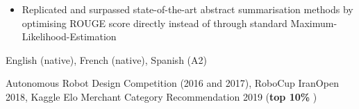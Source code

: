 \begin{itemize}
    \item Replicated and surpassed state-of-the-art abstract summarisation methods by optimising ROUGE score directly instead of through standard Maximum-Likelihood-Estimation
\end{itemize}{}






English (native), French (native), Spanish (A2)


Autonomous Robot Design Competition (2016 and 2017), RoboCup IranOpen 2018, Kaggle Elo Merchant Category Recommendation 2019 (\textbf{top 10\% })
\clearpage

